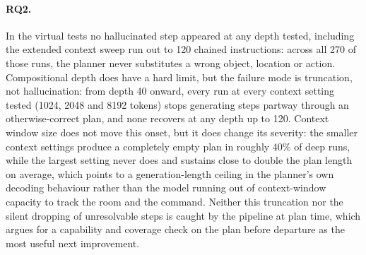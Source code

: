 \paragraph{RQ2.} In the virtual tests no hallucinated step appeared at any
depth tested, including the extended context sweep run out to 120 chained
instructions: across all 270 of those runs, the planner never substitutes a
wrong object, location or action. Compositional depth does have a hard limit,
but the failure mode is truncation, not hallucination: from depth 40 onward,
every run at every context setting tested (1024, 2048 and 8192 tokens) stops
generating steps partway through an otherwise-correct plan, and none recovers
at any depth up to 120. Context window size does not move this onset, but it
does change its severity: the smaller context settings produce a completely
empty plan in roughly 40\% of deep runs, while the largest setting never does
and sustains close to double the plan length on average, which points to a
generation-length ceiling in the planner's own decoding behaviour rather than
the model running out of context-window capacity to track the room and the
command. Neither this truncation nor the silent dropping of unresolvable steps
is caught by the pipeline at plan time, which argues for a capability and
coverage check on the plan before departure as the most useful next
improvement.


%
%

